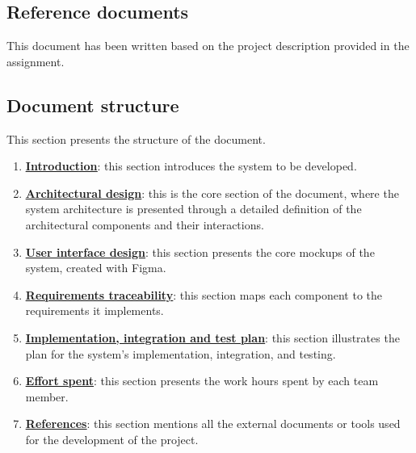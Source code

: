 \subsection{Reference documents}
This document has been written based on the project description provided in the assignment.
\subsection{Document structure}
This section presents the structure of the document.
\begin{enumerate}
    \item \textbf{\hyperref[section1]{\underline{Introduction}}}: this section introduces the system to be developed.
    \item \textbf{\hyperref[section2]{\underline{Architectural design}}}: this is the core section of the document, where the system architecture is presented through a detailed definition of the architectural components and their interactions.
    \item \textbf{\hyperref[section3]{\underline{User interface design}}}: this section presents the core mockups of the system, created with Figma.
    \item \textbf{\hyperref[section4]{\underline{Requirements traceability}}}: this section maps each component to the requirements it implements.
    \item \textbf{\hyperref[section5]{\underline{Implementation, integration and test plan}}}: this section illustrates the plan for the system's implementation, integration, and testing.
    \item \textbf{\hyperref[section6]{\underline{Effort spent}}}: this section presents the work hours spent by each team member.
    \item \textbf{\hyperref[section7]{\underline{References}}}: this section mentions all the external documents or tools used for the development of the project.
\end{enumerate}